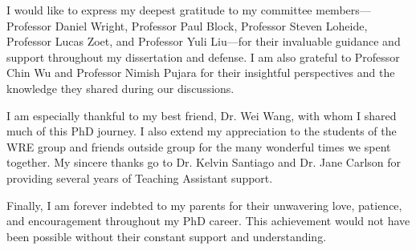 I would like to express my deepest gratitude to my committee members—Professor
Daniel Wright, Professor Paul Block, Professor Steven Loheide, Professor Lucas
Zoet, and Professor Yuli Liu—for their invaluable guidance and support
throughout my dissertation and defense. I am also grateful to Professor Chin Wu
and Professor Nimish Pujara for their insightful perspectives and the knowledge
they shared during our discussions.

I am especially thankful to my best friend, Dr. Wei Wang, with whom I shared
much of this PhD journey. I also extend my appreciation to the students of the
WRE group and friends outside group for the many wonderful times we spent
together. My sincere thanks go to Dr. Kelvin Santiago and Dr. Jane Carlson for
providing several years of Teaching Assistant support.

Finally, I am forever indebted to my parents for their unwavering love,
patience, and encouragement throughout my PhD career. This achievement would not
have been possible without their constant support and understanding.